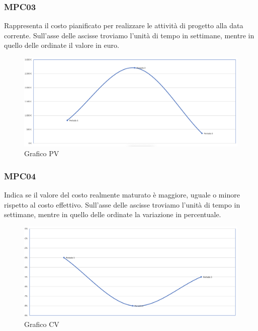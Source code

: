 \subsubsection{MPC03}
Rappresenta il costo pianificato per realizzare le attività di progetto alla data corrente.
Sull'asse delle ascisse troviamo l'unità di tempo in settimane, mentre in quello delle ordinate il valore in euro.
\begin{figure}[H]
\centering
\includegraphics[width=1\textwidth]{src/img/grafico_PV.png}
\caption{Grafico PV}
\end{figure}

\subsubsection{MPC04}
Indica se il valore del costo realmente maturato è maggiore, uguale o minore rispetto al costo effettivo.
Sull'asse delle ascisse troviamo l'unità di tempo in settimane, mentre in quello delle ordinate la variazione in percentuale.
\begin{figure}[H]
\centering
\includegraphics[width=1\textwidth]{src/img/grafico_CV.png}
\caption{Grafico CV}
\end{figure}

